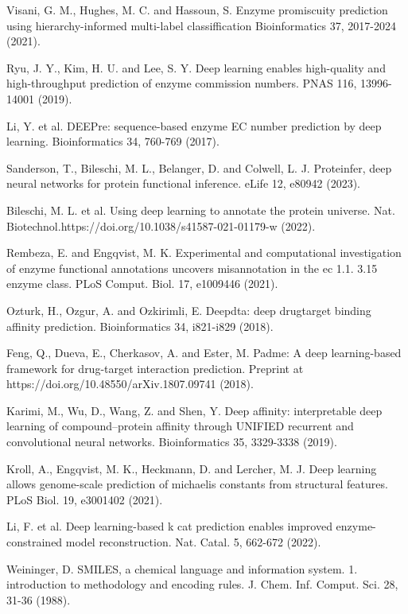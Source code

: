 \documentclass[12pt]{article}
\begin{document}
\begin{thebibliography}{99}
 Visani, G. M., Hughes, M. C. and Hassoun, S. Enzyme promiscuity prediction using hierarchy-informed multi-label classiffication Bioinformatics 37, 2017-2024 (2021).

 Ryu, J. Y., Kim, H. U. and Lee, S. Y. Deep learning enables high-quality and high-throughput prediction of enzyme commission numbers. PNAS 116, 13996-14001 (2019).

 Li, Y. et al. DEEPre: sequence-based enzyme EC number prediction by deep learning. Bioinformatics 34, 760-769 (2017).

 Sanderson, T., Bileschi, M. L., Belanger, D. and Colwell, L. J. Proteinfer, deep neural networks for protein functional inference. eLife 12, e80942 (2023).

 Bileschi, M. L. et al. Using deep learning to annotate the protein universe. Nat. Biotechnol.https://doi.org/10.1038/s41587-021-01179-w (2022).

 Rembeza, E. and Engqvist, M. K. Experimental and computational investigation of enzyme functional annotations uncovers misannotation in the ec 1.1. 3.15 enzyme class. PLoS Comput. Biol. 17, e1009446 (2021).

 Ozturk, H., Ozgur, A. and Ozkirimli, E. Deepdta: deep drugtarget binding affinity prediction. Bioinformatics 34, i821-i829 (2018).

 Feng, Q., Dueva, E., Cherkasov, A. and Ester, M. Padme: A deep learning-based framework for drug-target interaction prediction. Preprint at https://doi.org/10.48550/arXiv.1807.09741 (2018).

 Karimi, M., Wu, D., Wang, Z. and Shen, Y. Deep affinity: interpretable deep learning of compound–protein affinity through UNIFIED recurrent and convolutional neural networks. Bioinformatics 35, 3329-3338 (2019).

 Kroll, A., Engqvist, M. K., Heckmann, D. and Lercher, M. J. Deep learning allows genome-scale prediction of michaelis constants from structural features. PLoS Biol. 19, e3001402 (2021).

 Li, F. et al. Deep learning-based k cat prediction enables improved enzyme-constrained model reconstruction. Nat. Catal. 5, 662-672 (2022).

 Weininger, D. SMILES, a chemical language and information system. 1. introduction to methodology and encoding rules. J. Chem. Inf. Comput. Sci. 28, 31-36 (1988).


\end{thebibliography}
\end{document}
